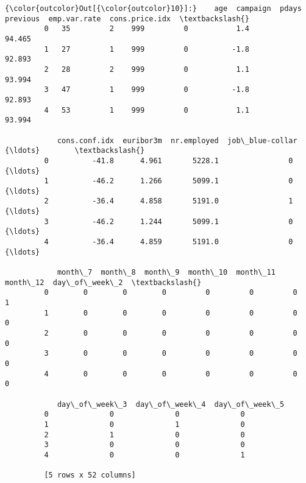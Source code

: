 \documentclass[11pt]{article}
\begin{document}
\begin{Verbatim}[commandchars=\\\{\}]
{\color{outcolor}Out[{\color{outcolor}10}]:}    age  campaign  pdays  previous  emp.var.rate  cons.price.idx  \textbackslash{}
         0   35         2    999         0           1.4          94.465   
         1   27         1    999         0          -1.8          92.893   
         2   28         2    999         0           1.1          93.994   
         3   47         1    999         0          -1.8          92.893   
         4   53         1    999         0           1.1          93.994   
         
            cons.conf.idx  euribor3m  nr.employed  job\_blue-collar      {\ldots}        \textbackslash{}
         0          -41.8      4.961       5228.1                0      {\ldots}         
         1          -46.2      1.266       5099.1                0      {\ldots}         
         2          -36.4      4.858       5191.0                1      {\ldots}         
         3          -46.2      1.244       5099.1                0      {\ldots}         
         4          -36.4      4.859       5191.0                0      {\ldots}         
         
            month\_7  month\_8  month\_9  month\_10  month\_11  month\_12  day\_of\_week\_2  \textbackslash{}
         0        0        0        0         0         0         0              1   
         1        0        0        0         0         0         0              0   
         2        0        0        0         0         0         0              0   
         3        0        0        0         0         0         0              0   
         4        0        0        0         0         0         0              0   
         
            day\_of\_week\_3  day\_of\_week\_4  day\_of\_week\_5  
         0              0              0              0  
         1              0              1              0  
         2              1              0              0  
         3              0              0              0  
         4              0              0              1  
         
         [5 rows x 52 columns]
\end{Verbatim}
            
\end{document}
